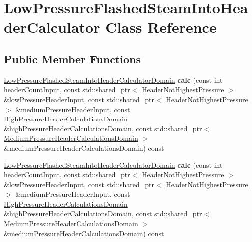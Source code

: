 \hypertarget{class_low_pressure_flashed_steam_into_header_calculator}{}\section{Low\+Pressure\+Flashed\+Steam\+Into\+Header\+Calculator Class Reference}
\label{class_low_pressure_flashed_steam_into_header_calculator}
\subsection*{Public Member Functions}
\begin{DoxyCompactItemize}
\item 
\mbox{\label{class_low_pressure_flashed_steam_into_header_calculator_a0dbdfb311a3f4f49919cd2015fbd1ac8}} 
\hyperlink{class_low_pressure_flashed_steam_into_header_calculator_domain}{Low\+Pressure\+Flashed\+Steam\+Into\+Header\+Calculator\+Domain} {\bfseries calc} (const int header\+Count\+Input, const std\+::shared\+\_\+ptr$<$ \hyperlink{class_header_not_highest_pressure}{Header\+Not\+Highest\+Pressure} $>$ \&low\+Pressure\+Header\+Input, const std\+::shared\+\_\+ptr$<$ \hyperlink{class_header_not_highest_pressure}{Header\+Not\+Highest\+Pressure} $>$ \&medium\+Pressure\+Header\+Input, const \hyperlink{class_high_pressure_header_calculations_domain}{High\+Pressure\+Header\+Calculations\+Domain} \&high\+Pressure\+Header\+Calculations\+Domain, const std\+::shared\+\_\+ptr$<$ \hyperlink{class_medium_pressure_header_calculations_domain}{Medium\+Pressure\+Header\+Calculations\+Domain} $>$ \&medium\+Pressure\+Header\+Calculations\+Domain) const
\item 
\mbox{\label{class_low_pressure_flashed_steam_into_header_calculator_a0dbdfb311a3f4f49919cd2015fbd1ac8}} 
\hyperlink{class_low_pressure_flashed_steam_into_header_calculator_domain}{Low\+Pressure\+Flashed\+Steam\+Into\+Header\+Calculator\+Domain} {\bfseries calc} (const int header\+Count\+Input, const std\+::shared\+\_\+ptr$<$ \hyperlink{class_header_not_highest_pressure}{Header\+Not\+Highest\+Pressure} $>$ \&low\+Pressure\+Header\+Input, const std\+::shared\+\_\+ptr$<$ \hyperlink{class_header_not_highest_pressure}{Header\+Not\+Highest\+Pressure} $>$ \&medium\+Pressure\+Header\+Input, const \hyperlink{class_high_pressure_header_calculations_domain}{High\+Pressure\+Header\+Calculations\+Domain} \&high\+Pressure\+Header\+Calculations\+Domain, const std\+::shared\+\_\+ptr$<$ \hyperlink{class_medium_pressure_header_calculations_domain}{Medium\+Pressure\+Header\+Calculations\+Domain} $>$ \&medium\+Pressure\+Header\+Calculations\+Domain) const

\end{DoxyCompactItemize}
